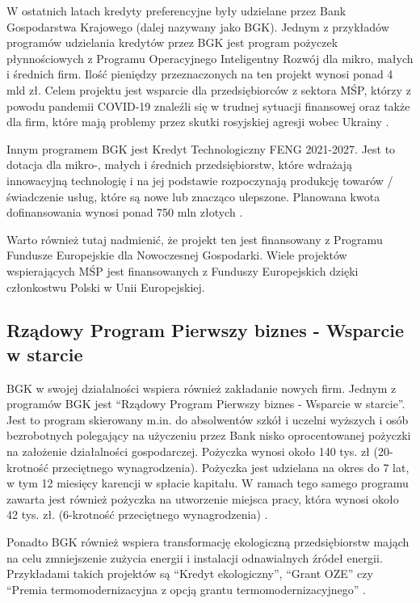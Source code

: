 \documentclass[11pt]{article}
\begin{document}
\medskip

W ostatnich latach kredyty preferencyjne były udzielane przez Bank Gospodarstwa Krajowego (dalej nazywany jako BGK).
Jednym z przykładów programów udzielania kredytów przez BGK jest program pożyczek płynnościowych z
Programu Operacyjnego Inteligentny Rozwój dla mikro, małych i średnich firm.
Ilość pieniędzy przeznaczonych na ten projekt wynosi ponad 4 mld zł. Celem projektu jest wsparcie dla przedsiębiorców z sektora MŚP,
którzy z powodu pandemii COVID-19 znaleźli się w trudnej sytuacji finansowej oraz także dla firm, które mają problemy przez skutki
rosyjskiej agresji wobec Ukrainy \cite{BgkProgramPlynnosci}.

Innym programem BGK jest Kredyt Technologiczny FENG 2021-2027. Jest to dotacja dla mikro-, małych i średnich przedsiębiorstw,
które wdrażają innowacyjną technologię i na jej podstawie rozpoczynają produkcję towarów / świadczenie usług, które są nowe lub znacząco ulepszone.
Planowana kwota dofinansowania wynosi ponad 750 mln złotych \cite{KredytTechnologicznyFENG}.

Warto również tutaj nadmienić, że projekt ten jest finansowany z Programu Fundusze Europejskie dla Nowoczesnej Gospodarki.
Wiele projektów wspierających MŚP jest finansowanych z Funduszy Europejskich dzięki członkostwu Polski w Unii Europejskiej.

\subsection*{Rządowy Program Pierwszy biznes - Wsparcie w starcie}

BGK w swojej działalności wspiera również zakładanie nowych firm. Jednym z programów BGK jest ``Rządowy Program Pierwszy biznes - Wsparcie w starcie''.
Jest to program skierowany m.in. do absolwentów szkół i uczelni wyższych i osób bezrobotnych polegający na użyczeniu przez Bank nisko oprocentowanej
pożyczki na założenie działalności gospodarczej. Pożyczka wynosi około 140 tys. zł (20-krotność przeciętnego wynagrodzenia). Pożyczka jest udzielana na okres do 7 lat,
w tym 12 miesięcy karencji w spłacie kapitału. W ramach tego samego programu zawarta jest również pożyczka na utworzenie miejsca pracy, która wynosi około 42 tys. zł.
(6-krotność przeciętnego wynagrodzenia) \cite{BgkProgramStart}.

Ponadto BGK również wspiera transformację ekologiczną przedsiębiorstw mająch na celu zmniejszenie zużycia energii i instalacji odnawialnych źródeł energii.
Przykładami takich projektów są ``Kredyt ekologiczny'', ``Grant OZE'' czy ``Premia termomodernizacyjna z opcją grantu termomodernizacyjnego'' \cite{BgkProgramEkologia}.
\end{document}
